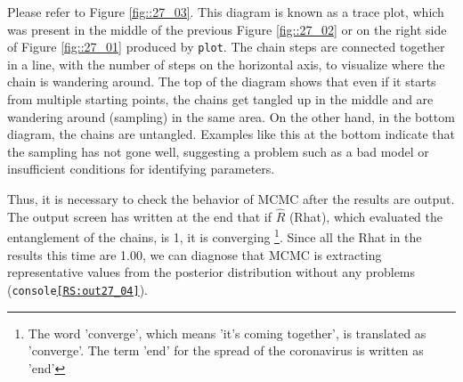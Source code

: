 \documentclass{ltjsarticle}
\begin{document}
Please refer to Figure \ref{fig::27_03}. This diagram is known as a trace plot, which was present in the middle of the previous Figure \ref{fig::27_02} or on the right side of Figure \ref{fig::27_01} produced by \texttt{plot}. The chain steps are connected together in a line, with the number of steps on the horizontal axis, to visualize where the chain is wandering around. The top of the diagram shows that even if it starts from multiple starting points, the chains get tangled up in the middle and are wandering around (sampling) in the same area. On the other hand, in the bottom diagram, the chains are untangled. Examples like this at the bottom indicate that the sampling has not gone well, suggesting a problem such as a bad model or insufficient conditions for identifying parameters.

Thus, it is necessary to check the behavior of MCMC after the results are output. The output screen has written at the end that if $\hat{R}$ (Rhat), which evaluated the entanglement of the chains, is 1, it is converging \footnote{The word 'converge', which means 'it's coming together', is translated as 'converge'. The term 'end' for the spread of the coronavirus is written as 'end'}. Since all the Rhat in the results this time are 1.00, we can diagnose that MCMC is extracting representative values from the posterior distribution without any problems (\texttt{console\ref{RS:out27_04}}).
\end{document}
